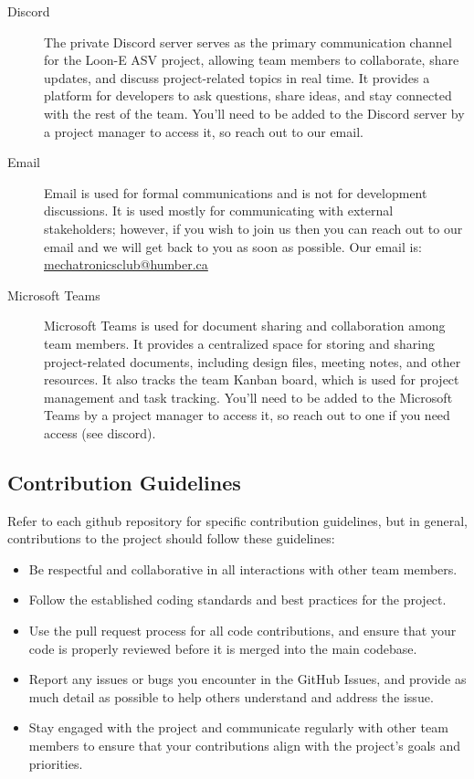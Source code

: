 \begin{description}
    \item[Discord]
        The private Discord server serves as the primary communication channel for the Loon-E ASV project, allowing team members to collaborate, share updates, and discuss project-related topics in real time. 
        It provides a platform for developers to ask questions, share ideas, and stay connected with the rest of the team.
        You'll need to be added to the Discord server by a project manager to access it, so reach out to our email.

    \item[Email]
        Email is used for formal communications and is not for development discussions. 
        It is used mostly for communicating with external stakeholders; however, if you wish to join us then you can reach out to our email and we will get back to you as soon as possible.
        Our email is: \href{mailto:mechatronicsclub@humber.ca}{mechatronicsclub@humber.ca}

    \item[Microsoft Teams]
        Microsoft Teams is used for document sharing and collaboration among team members. 
        It provides a centralized space for storing and sharing project-related documents, including design files, meeting notes, and other resources.
        It also tracks the team Kanban board, which is used for project management and task tracking.
        You'll need to be added to the Microsoft Teams by a project manager to access it, so reach out to one if you need access (see discord).
\end{description}

\subsection{Contribution Guidelines}
Refer to each github repository for specific contribution guidelines, but in general, contributions to the project should follow these guidelines:

\begin{itemize}
    \item{Be respectful and collaborative in all interactions with other team members.}
    \item{Follow the established coding standards and best practices for the project.}
    \item{Use the pull request process for all code contributions, and ensure that your code is properly reviewed before it is merged into the main codebase.}
    \item{Report any issues or bugs you encounter in the GitHub Issues, and provide as much detail as possible to help others understand and address the issue.}
    \item{Stay engaged with the project and communicate regularly with other team members to ensure that your contributions align with the project's goals and priorities.}
\end{itemize}

